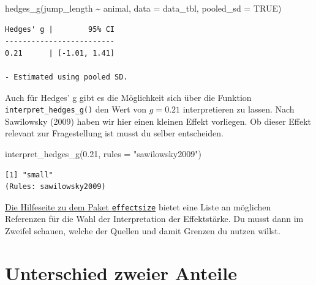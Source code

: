 \documentclass[
  letterpaper,
]{scrbook}
\newenvironment{Shaded}{\begin{snugshade}}{\end{snugshade}}
\newcommand{\AttributeTok}[1]{\textcolor[rgb]{0.40,0.45,0.13}{#1}}
\newcommand{\ConstantTok}[1]{\textcolor[rgb]{0.56,0.35,0.01}{#1}}
\newcommand{\FloatTok}[1]{\textcolor[rgb]{0.68,0.00,0.00}{#1}}
\newcommand{\FunctionTok}[1]{\textcolor[rgb]{0.28,0.35,0.67}{#1}}
\newcommand{\NormalTok}[1]{\textcolor[rgb]{0.00,0.23,0.31}{#1}}
\newcommand{\SpecialCharTok}[1]{\textcolor[rgb]{0.37,0.37,0.37}{#1}}
\newcommand{\StringTok}[1]{\textcolor[rgb]{0.13,0.47,0.30}{#1}}
\begin{document}
\begin{Shaded}
\begin{Highlighting}[]
\FunctionTok{hedges\_g}\NormalTok{(jump\_length }\SpecialCharTok{\textasciitilde{}}\NormalTok{ animal, }\AttributeTok{data =}\NormalTok{ data\_tbl, }\AttributeTok{pooled\_sd =} \ConstantTok{TRUE}\NormalTok{)}
\end{Highlighting}
\end{Shaded}

\begin{verbatim}
Hedges' g |        95% CI
-------------------------
0.21      | [-1.01, 1.41]

- Estimated using pooled SD.
\end{verbatim}

Auch für Hedges' g gibt es die Möglichkeit sich über die Funktion
\texttt{interpret\_hedges\_g()} den Wert von \(g=0.21\) interpretieren
zu lassen. Nach Sawilowsky (2009) haben wir hier einen kleinen Effekt
vorliegen. Ob dieser Effekt relevant zur Fragestellung ist musst du
selber entscheiden.

\begin{Shaded}
\begin{Highlighting}[]
\FunctionTok{interpret\_hedges\_g}\NormalTok{(}\FloatTok{0.21}\NormalTok{, }\AttributeTok{rules =} \StringTok{"sawilowsky2009"}\NormalTok{)}
\end{Highlighting}
\end{Shaded}

\begin{verbatim}
[1] "small"
(Rules: sawilowsky2009)
\end{verbatim}

\href{https://easystats.github.io/effectsize/reference/interpret_cohens_d.html}{Die
Hilfeseite zu dem Paket \texttt{effectsize}} bietet eine Liste an
möglichen Referenzen für die Wahl der Interpretation der Effektstärke.
Du musst dann im Zweifel schauen, welche der Quellen und damit Grenzen
du nutzen willst.

\hypertarget{unterschied-zweier-anteile}{%
\section{Unterschied zweier Anteile}\label{unterschied-zweier-anteile}}

{}
\end{document}
